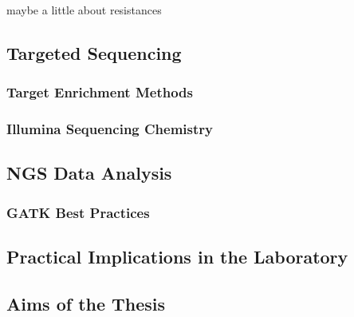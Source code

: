     maybe a little about resistances

  \subsection{Targeted Sequencing}

    \subsubsection{Target Enrichment Methods}

    \subsubsection{Illumina Sequencing Chemistry}

  \subsection{NGS Data Analysis}

    \subsubsection{GATK Best Practices}

  \subsection{Practical Implications in the Laboratory}

  \subsection{Aims of the Thesis}
